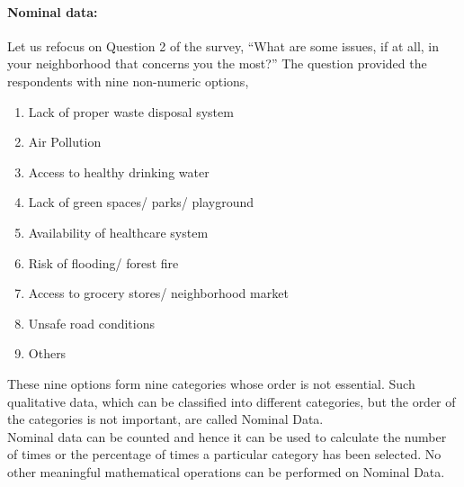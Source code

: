 \documentclass[a4paper, 11pt]{article}
\begin{document}
	\paragraph{Nominal data:} Let us refocus on Question 2 of the survey, “What are some issues, if at all, in your neighborhood that concerns you the most?” The question provided the respondents with nine non-numeric options,
	\begin{enumerate}[label=(\alph*), noitemsep]
		\item 
		Lack of proper waste disposal system
		\item
		Air Pollution
		\item
		Access to healthy drinking water
		\item
		Lack of green spaces/ parks/ playground
		\item
		Availability of healthcare system
		\item
		Risk of flooding/ forest fire
		\item
		Access to grocery stores/ neighborhood market
		\item
		Unsafe road conditions
		\item
		Others
		\end{enumerate}
	These nine options form nine categories whose order is not essential. Such qualitative data, which can be classified into different categories, but the order of the categories is not important, are called Nominal Data.\\[1ex]
Nominal data can be counted and hence it can be used to calculate the number of times or the percentage of times a particular category has been selected. No other meaningful mathematical operations can be performed on Nominal Data. 
%	
\end{document}
